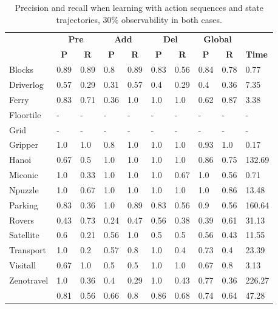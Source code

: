 \begin{table}[hbt!]
	\begin{center}
		\begin{footnotesize}
		\begin{tabular}{l|l|l|l|l|l|l||l|l||l|}
			& \multicolumn{2}{|c|}{\bf Pre} & \multicolumn{2}{|c|}{\bf Add} & \multicolumn{2}{|c||}{\bf Del} & \multicolumn{2}{|c|}{\bf Global} & \\ \cline{2-9}			
			& \multicolumn{1}{|c|}{\bf P} & \multicolumn{1}{|c|}{\bf R} & \multicolumn{1}{|c|}{\bf P} & \multicolumn{1}{|c|}{\bf R} & \multicolumn{1}{|c|}{\bf P} & \multicolumn{1}{|c||}{\bf R} &  \multicolumn{1}{|c|}{\bf P} & \multicolumn{1}{|c|}{\bf R} & {\bf Time} \\
			\hline
			Blocks & 0.89 & 0.89 & 0.8 & 0.89 & 0.83 & 0.56 & 0.84 & 0.78& 0.77 \\ 
			Driverlog & 0.57 & 0.29 & 0.31 & 0.57 & 0.4 & 0.29 & 0.4 & 0.36& 7.35 \\ 
			Ferry & 0.83 & 0.71 & 0.36 & 1.0 & 1.0 & 1.0 & 0.62 & 0.87& 3.38 \\ 
			Floortile & - & - & - & - & - & - & - & - & - \\ 
			Grid & - & - & - & - & - & - & - & - & - \\ 
			Gripper & 1.0 & 1.0 & 0.8 & 1.0 & 1.0 & 1.0 & 0.93 & 1.0& 0.17 \\ 
			Hanoi & 0.67 & 0.5 & 1.0 & 1.0 & 1.0 & 1.0 & 0.86 & 0.75& 132.69 \\ 
			Miconic & 1.0 & 0.33 & 1.0 & 1.0 & 1.0 & 0.67 & 1.0 & 0.56& 0.71 \\ 
			Npuzzle & 1.0 & 0.67 & 1.0 & 1.0 & 1.0 & 1.0 & 1.0 & 0.86& 13.48 \\ 
			Parking & 0.83 & 0.36 & 1.0 & 0.89 & 0.83 & 0.56 & 0.9 & 0.56& 160.64 \\
			Rovers & 0.43 & 0.73 & 0.24 & 0.47 & 0.56 & 0.38 & 0.39 & 0.61& 31.13 \\ 
			Satellite & 0.6 & 0.21 & 0.56 & 1.0 & 0.5 & 0.5 & 0.56 & 0.43& 11.55 \\ 
			Transport & 1.0 & 0.2 & 0.57 & 0.8 & 1.0 & 0.4 & 0.73 & 0.4& 23.39 \\ 
			Visitall & 0.67 & 1.0 & 0.5 & 0.5 & 1.0 & 1.0 & 0.67 & 0.8& 3.13 \\ 
			Zenotravel & 1.0 & 0.36 & 0.4 & 0.29 & 1.0 & 0.43 & 0.77 & 0.36& 226.27 \\
			\hline
			\bf & 0.81 & 0.56 & 0.66 & 0.8 & 0.86 & 0.68 & 0.74 & 0.64 & 47.28
			
		\end{tabular}
		\end{footnotesize}
	\end{center}
	\caption{\small Precision and recall when learning with \PO action sequences and \PO state trajectories, 30\% observability in both cases.}
	\label{tab:results_minimum_30_30}
\end{table}


